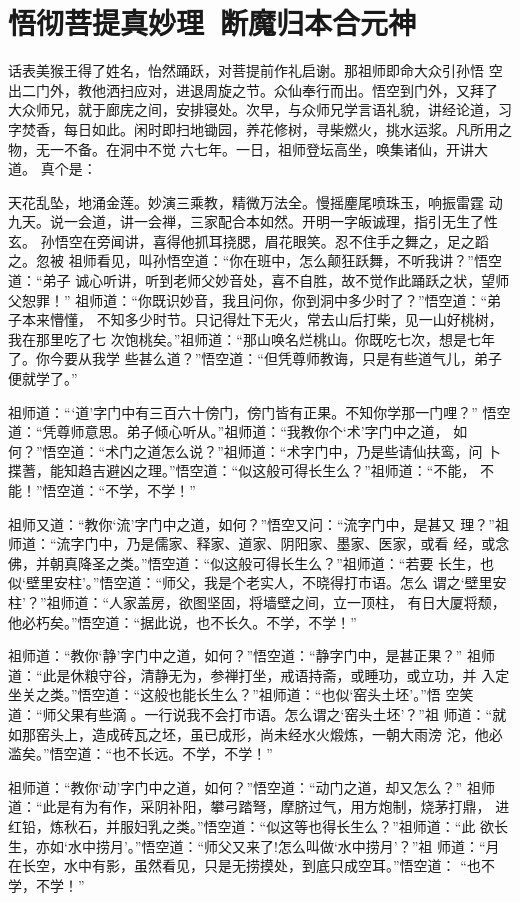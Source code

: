 \chapter{悟彻菩提真妙理~断魔归本合元神}

话表美猴王得了姓名，怡然踊跃，对菩提前作礼启谢。那祖师即命大众引孙悟
空出二门外，教他洒扫应对，进退周旋之节。众仙奉行而出。悟空到门外，又拜了
大众师兄，就于廊庑之间，安排寝处。次早，与众师兄学言语礼貌，讲经论道，习
字焚香，每日如此。闲时即扫地锄园，养花修树，寻柴燃火，挑水运浆。凡所用之
物，无一不备。在洞中不觉六七年。一日，祖师登坛高坐，唤集诸仙，开讲大道。
真个是：

天花乱坠，地涌金莲。妙演三乘教，精微万法全。慢摇麈尾喷珠玉，响振雷霆
动九天。说一会道，讲一会禅，三家配合本如然。开明一字皈诚理，指引无生了性
玄。
孙悟空在旁闻讲，喜得他抓耳挠腮，眉花眼笑。忍不住手之舞之，足之蹈之。忽被
祖师看见，叫孙悟空道：“你在班中，怎么颠狂跃舞，不听我讲？”悟空道：“弟子
诚心听讲，听到老师父妙音处，喜不自胜，故不觉作此踊跃之状，望师父恕罪！”
祖师道：“你既识妙音，我且问你，你到洞中多少时了？”悟空道：“弟子本来懵懂，
不知多少时节。只记得灶下无火，常去山后打柴，见一山好桃树，我在那里吃了七
次饱桃矣。”祖师道：“那山唤名烂桃山。你既吃七次，想是七年了。你今要从我学
些甚么道？”悟空道：“但凭尊师教诲，只是有些道气儿，弟子便就学了。”

祖师道：“‘道’字门中有三百六十傍门，傍门皆有正果。不知你学那一门哩？”
悟空道：“凭尊师意思。弟子倾心听从。”祖师道：“我教你个‘术’字门中之道，
如何？”悟空道：“术门之道怎么说？”祖师道：“术字门中，乃是些请仙扶鸾，问
卜揲蓍，能知趋吉避凶之理。”悟空道：“似这般可得长生么？”祖师道：“不能，
不能！”悟空道：“不学，不学！”

祖师又道：“教你‘流’字门中之道，如何？”悟空又问：“流字门中，是甚又
理？”祖师道：“流字门中，乃是儒家、释家、道家、阴阳家、墨家、医家，或看
经，或念佛，并朝真降圣之类。”悟空道：“似这般可得长生么？”祖师道：“若要
长生，也似‘壁里安柱’。”悟空道：“师父，我是个老实人，不晓得打市语。怎么
谓之‘壁里安柱’？”祖师道：“人家盖房，欲图坚固，将墙壁之间，立一顶柱，
有日大厦将颓，他必朽矣。”悟空道：“据此说，也不长久。不学，不学！”

祖师道：“教你‘静’字门中之道，如何？”悟空道：“静字门中，是甚正果？”
祖师道：“此是休粮守谷，清静无为，参禅打坐，戒语持斋，或睡功，或立功，并
入定坐关之类。”悟空道：“这般也能长生么？”祖师道：“也似‘窑头土坯’。”悟
空笑道：“师父果有些滴。一行说我不会打市语。怎么谓之‘窑头土坯’？”祖
师道：“就如那窑头上，造成砖瓦之坯，虽已成形，尚未经水火煅炼，一朝大雨滂
沱，他必滥矣。”悟空道：“也不长远。不学，不学！”

祖师道：“教你‘动’字门中之道，如何？”悟空道：“动门之道，却又怎么？”
祖师道：“此是有为有作，采阴补阳，攀弓踏弩，摩脐过气，用方炮制，烧茅打鼎，
进红铅，炼秋石，并服妇乳之类。”悟空道：“似这等也得长生么？”祖师道：“此
欲长生，亦如‘水中捞月’。”悟空道：“师父又来了!怎么叫做‘水中捞月’？”祖
师道：“月在长空，水中有影，虽然看见，只是无捞摸处，到底只成空耳。”悟空道：
“也不学，不学！”

